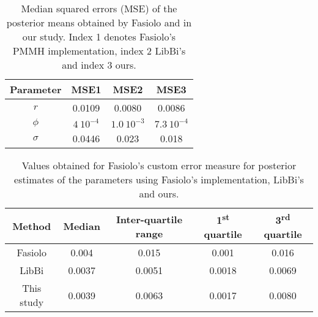 \documentclass[12pt]{article}
\newcommand{\ra}[1]{\renewcommand{\arraystretch}{#1}}
\begin{document}
	\begin{table}[htb]
		\centering
		\ra{1.3}
		\begin{tabular}{@{}cccc@{}} \toprule
			Parameter & MSE1 & MSE2 & MSE3\\ \midrule 
			$r$ & 0.0109 & 0.0080 &  0.0086 \\ 
			$\phi$ & $4 \ 10^{-4}$ & $1.0 \ 10^{-3}$ &  $7.3 \ 10^{-4}$ \\ 
			$\sigma$ & 0.0446 & 0.023 & 0.018  \\ \bottomrule
		\end{tabular}
		\caption[Comparison between the mean square errors of posterior estimates of the parameters obtain in this study and in Fasiolo's ]{Median squared errors (MSE) of the posterior means obtained by Fasiolo and in our study. Index 1 denotes Fasiolo's PMMH implementation, index 2 LibBi's and index 3 ours.}
		\label{table:mse}
	\end{table}

	\begin{table}[htb]
		\centering
		\ra{1.3}
		\begin{tabular}{@{}ccccc@{}} \toprule
			Method & Median &  Inter-quartile range & 1\textsuperscript{st} quartile & 3\textsuperscript{rd} quartile \\ \midrule 
			Fasiolo & 0.004 & 0.015 & 0.001 & 0.016\\ 
			LibBi & 0.0037 & 0.0051 &0.0018 & 0.0069 \\ 
			This study & 0.0039 &  0.0063 & 0.0017 & 0.0080\\ \bottomrule
		\end{tabular}
		\caption[Comparison between Fasiolo's custim error measure for posterior estimates of the parameters obtain in this study and in Fasiolo's ]{Values obtained for Fasiolo's custom error measure for posterior estimates of the parameters using Fasiolo's implementation, LibBi's and ours.}
		\label{table:metric}
	\end{table}
	
\end{document}
